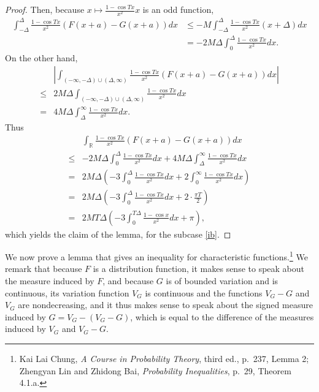 \documentclass{article}
\theoremstyle{definition}
\theoremstyle{definition}
\begin{document}
\begin{proof}
Then, because $x \mapsto \frac{1-\cos Tx}{x^2} x$ is an odd function,
\begin{align*}
\int_{-\Delta}^\Delta \frac{1-\cos Tx}{x^2} (F(x+a)-G(x+a)) dx&\leq -M \int_{-\Delta}^\Delta \frac{1-\cos Tx}{x^2}
(x+\Delta) dx\\
&=-2M\Delta \int_0^\Delta \frac{1-\cos Tx}{x^2} dx. 
\end{align*}
On the other hand,
\[
\begin{split}
&\left|\int_{(-\infty,-\Delta) \cup (\Delta,\infty)}
\frac{1-\cos Tx}{x^2} (F(x+a)-G(x+a)) dx\right|\\
\leq&2M \Delta \int_{(-\infty,-\Delta) \cup (\Delta,\infty)} \frac{1-\cos Tx}{x^2} dx\\
=&4M\Delta \int_\Delta^\infty  \frac{1-\cos Tx}{x^2} dx.
\end{split}
\]
Thus
\[
\begin{split}
&\int_\mathbb{R} \frac{1-\cos Tx}{x^2} (F(x+a)-G(x+a)) dx\\
\leq& -2M\Delta \int_0^\Delta \frac{1-\cos Tx}{x^2} dx
+4M\Delta \int_\Delta^\infty  \frac{1-\cos Tx}{x^2} dx\\
=&2M\Delta \left(-3\int_0^\Delta \frac{1-\cos Tx}{x^2} dx
+2\int_0^\infty \frac{1-\cos Tx}{x^2} dx\right)\\
=&2M\Delta \left(-3\int_0^\Delta \frac{1-\cos Tx}{x^2} dx + 2 \cdot \frac{\pi T}{2} \right)\\
=&2M T \Delta \left(-3 \int_0^{T\Delta} \frac{1-\cos x}{x^2} dx +\pi\right),
\end{split}
\]
which yields the claim of the lemma, for the subcase \eqref{ib}.
\end{proof}


We now prove a lemma that gives an inequality for characteristic functions.\footnote{Kai Lai Chung,
{\em A Course in Probability Theory}, third ed.,
p.~237, Lemma 2;
Zhengyan Lin and Zhidong Bai, {\em Probability Inequalities}, p.~29, Theorem 4.1.a.}
We remark that because $F$ is a distribution function,
it makes sense to speak about the  measure induced by $F$, and because $G$ is of bounded variation and is continuous,
its variation function  $V_G$ is continuous and the functions $V_G-G$ and $V_G$ are nondecreasing,
and it thus makes sense to speak about the signed measure induced by $G=V_G-(V_G-G)$, which is
equal to the difference of the  measures induced by $V_G$ and $V_G-G$.
\end{document}
